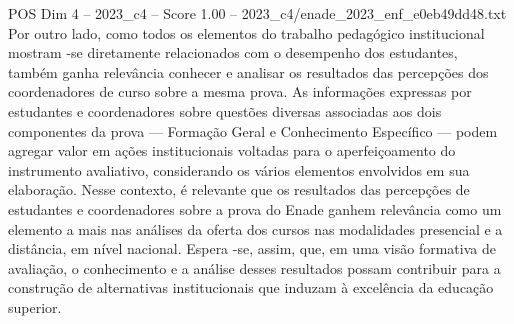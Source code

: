 \begin{textsample}{POS Dim 4 – 2023\_c4 – Score 1.00 – 2023\_c4/enade\_2023\_enf\_e0eb49dd48.txt}
Por outro lado, como todos os elementos do trabalho pedagógico institucional mostram -se diretamente relacionados com o desempenho dos estudantes, também ganha relevância conhecer e analisar os resultados das percepções dos coordenadores de curso sobre a mesma prova.
As informações expressas por estudantes e coordenadores sobre questões diversas associadas aos dois componentes da prova — Formação Geral e Conhecimento Específico — podem agregar valor em ações institucionais voltadas para o aperfeiçoamento do instrumento avaliativo, considerando os vários elementos envolvidos em sua elaboração.
Nesse contexto, é relevante que os resultados das percepções de estudantes e coordenadores sobre a prova do Enade ganhem relevância como um elemento a mais nas análises da oferta dos cursos nas modalidades presencial e a distância, em nível nacional.
Espera -se, assim, que, em uma visão formativa de avaliação, o conhecimento e a análise desses resultados possam contribuir para a construção de alternativas institucionais que induzam à excelência da educação superior.

\end{textsample}
